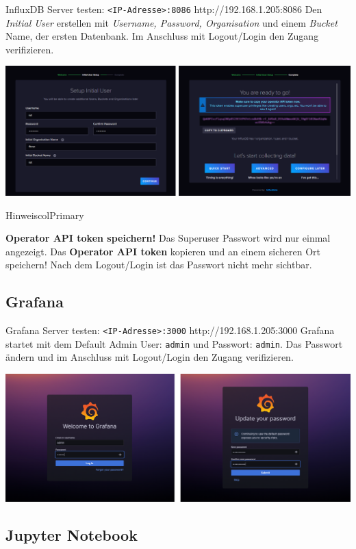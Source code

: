\documentclass[
  11pt,
  a4paper,
  oneside, openany  ,captions=tableheading
]{scrbook}
\theoremstyle{remark}
\begin{document}
InfluxDB Server testen:
\texttt{\textless{}IP-Adresse\textgreater{}:8086}
http://192.168.1.205:8086 Den \emph{Initial User} erstellen mit
\emph{Username, Password, Organisation} und einem \emph{Bucket} Name,
der ersten Datenbank. Im Anschluss mit Logout/Login den Zugang
verifizieren.

\includegraphics{images/5200_iot_influxdb_setup.png}

\begin{boxtitle}{Hinweis}{colPrimary}

\textbf{Operator API token speichern!} Das Superuser Passwort wird nur
einmal angezeigt. Das \textbf{Operator API token} kopieren und an einem
sicheren Ort speichern! Nach dem Logout/Login ist das Passwort nicht
mehr sichtbar.

\end{boxtitle}

\subsection{Grafana}\label{grafana}

Grafana Server testen: \texttt{\textless{}IP-Adresse\textgreater{}:3000}
http://192.168.1.205:3000 Grafana startet mit dem Default Admin User:
\texttt{admin} und Passwort: \texttt{admin}. Das Passwort ändern und im
Anschluss mit Logout/Login den Zugang verifizieren.

\includegraphics{images/5200_iot_grafana_setup.png}

\subsection{Jupyter Notebook}\label{jupyter-notebook}
\end{document}
